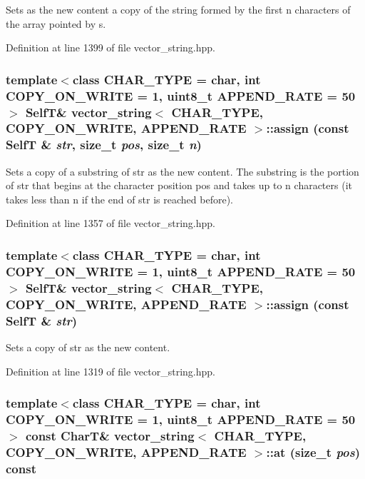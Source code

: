 Sets as the new content a copy of the string formed by the first n characters of the array pointed by s. 

Definition at line 1399 of file vector\_\-string.hpp.\hypertarget{classvector__string_370b202bdf3c095e5d91e2d1695bed8b}{
\subsubsection[{assign}]{\setlength{\rightskip}{0pt plus 5cm}template$<$class CHAR\_\-TYPE  = char, int COPY\_\-ON\_\-WRITE = 1, uint8\_\-t APPEND\_\-RATE = 50$>$ {\bf SelfT}\& {\bf vector\_\-string}$<$ CHAR\_\-TYPE, COPY\_\-ON\_\-WRITE, APPEND\_\-RATE $>$::assign (const {\bf SelfT} \& {\em str}, \/  size\_\-t {\em pos}, \/  size\_\-t {\em n})}}
\label{classvector__string_370b202bdf3c095e5d91e2d1695bed8b}


Sets a copy of a substring of str as the new content. The substring is the portion of str that begins at the character position pos and takes up to n characters (it takes less than n if the end of str is reached before). 

Definition at line 1357 of file vector\_\-string.hpp.\hypertarget{classvector__string_58a2e4110d4653022e5da2a46e5d56e5}{
\subsubsection[{assign}]{\setlength{\rightskip}{0pt plus 5cm}template$<$class CHAR\_\-TYPE  = char, int COPY\_\-ON\_\-WRITE = 1, uint8\_\-t APPEND\_\-RATE = 50$>$ {\bf SelfT}\& {\bf vector\_\-string}$<$ CHAR\_\-TYPE, COPY\_\-ON\_\-WRITE, APPEND\_\-RATE $>$::assign (const {\bf SelfT} \& {\em str})}}
\label{classvector__string_58a2e4110d4653022e5da2a46e5d56e5}


Sets a copy of str as the new content. 

Definition at line 1319 of file vector\_\-string.hpp.\hypertarget{classvector__string_e262ba5e7759fb7e570c459c2ec064ce}{
\subsubsection[{at}]{\setlength{\rightskip}{0pt plus 5cm}template$<$class CHAR\_\-TYPE  = char, int COPY\_\-ON\_\-WRITE = 1, uint8\_\-t APPEND\_\-RATE = 50$>$ const CharT\& {\bf vector\_\-string}$<$ CHAR\_\-TYPE, COPY\_\-ON\_\-WRITE, APPEND\_\-RATE $>$::at (size\_\-t {\em pos}) const}}
\label{classvector__string_e262ba5e7759fb7e570c459c2ec064ce}


